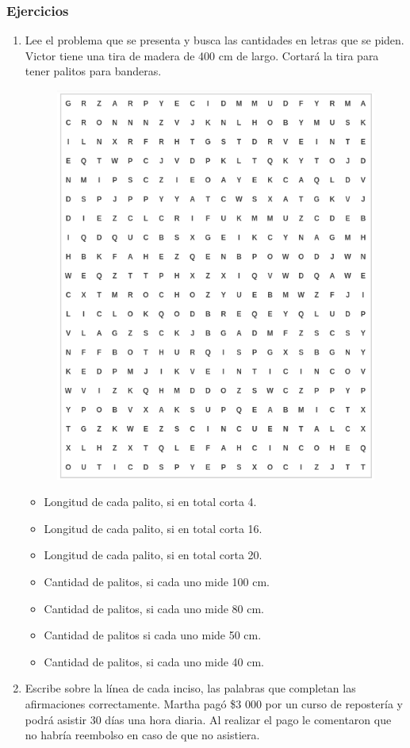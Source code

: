 \documentclass[11pt]{book}
\begin{document}
\subsubsection{Ejercicios}
\begin{enumerate}
  \item Lee el problema que se presenta y busca las cantidades en letras que se piden.
        Victor tiene una tira de madera de 400 cm de largo. Cortará la tira para tener palitos para banderas.
        \begin{figure}[H]
          \centering
          \includegraphics[width=0.75\linewidth]{sopa}
        \end{figure}%
        \begin{itemize}
          \item Longitud de cada palito, si en total corta 4.
          \item Longitud de cada palito, si en total corta 16.
          \item Longitud de cada palito, si en total corta 20.
          \item Cantidad de palitos, si cada uno mide 100 cm.
          \item Cantidad de palitos, si cada uno mide 80 cm.
          \item Cantidad de palitos si cada uno mide 50 cm.
          \item Cantidad de palitos, si cada uno mide 40 cm.
        \end{itemize}
        \newpage
  \item Escribe sobre la l\'inea de cada inciso, las palabras que completan las afirmaciones correctamente.
        Martha pagó \$3 000 por un curso de repostería y podrá asistir 30 días una hora diaria.
        Al realizar el pago le comentaron que no habría reembolso en caso de que no asistiera.


\end{enumerate}
\end{document}
